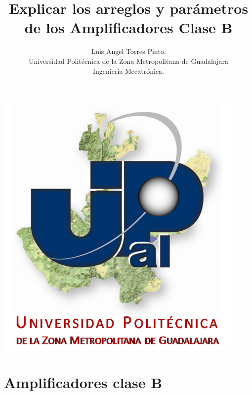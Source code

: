 \documentclass[10pt,a4paper]{article}
\author{Luis Angel Torres Pinto.\\Universidad Politécnica de la Zona Metropolitana de Guadalajara\\Ingeniería Mecatrónica. }
\title{Explicar los arreglos y parámetros de los Amplificadores Clase B}
\begin{document}
\maketitle
\centering
\includegraphics[scale=1.80]{upzmg.jpg}\\ 
\raggedright
\newpage
\section{Amplificadores clase B}
\end{document}
